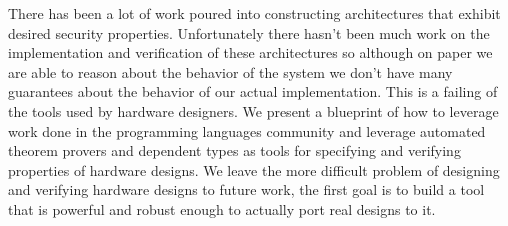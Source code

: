 \documentclass[12pt, titlepage]{article}
\begin{document}
There has been a lot of work poured into constructing architectures that exhibit desired security properties. Unfortunately there hasn't been
much work on the implementation and verification of these architectures so although on paper we are able to reason about the behavior of the
system we don't have many guarantees about the behavior of our actual implementation. This is a failing of the tools used by hardware
designers. We present a blueprint of how to leverage work done in the programming languages community and leverage automated theorem provers
and dependent types as tools for specifying and verifying properties of hardware designs. We leave the more difficult problem of designing and
verifying hardware designs to future work, the first goal is to build a tool that is powerful and robust enough to actually port real designs
to it.



\end{document}

